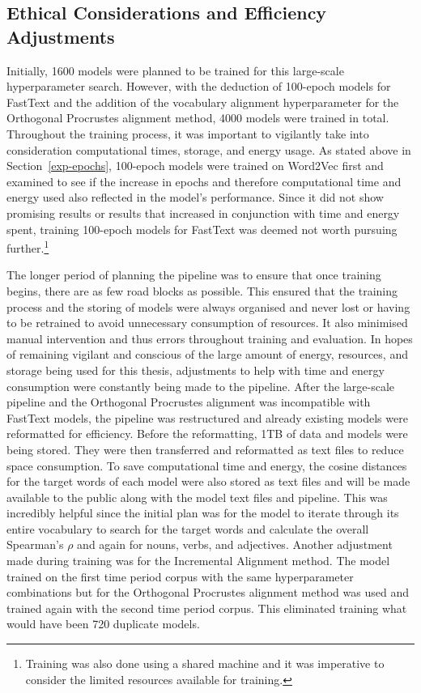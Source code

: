 \subsection{Ethical Considerations and Efficiency Adjustments}
\label{exp-ethics}

Initially, 1600 models were planned to be trained for this large-scale hyperparameter search. However, with the deduction of 100-epoch models for FastText and the addition of the vocabulary alignment hyperparameter for the Orthogonal Procrustes alignment method, 4000 models were trained in total. Throughout the training process, it was important to vigilantly take into consideration computational times, storage, and energy usage. As stated above in Section~\ref{exp-epochs}, 100-epoch models were trained on Word2Vec first and examined to see if the increase in epochs and therefore computational time and energy used also reflected in the model’s performance. Since it did not show promising results or results that increased in conjunction with time and energy spent, training 100-epoch models for FastText was deemed not worth pursuing further.\footnote{Training was also done using a shared machine and it was imperative to consider the limited resources available for training.} 

The longer period of planning the pipeline was to ensure that once training begins, there are as few road blocks as possible. This ensured that the training process and the storing of models were always organised and never lost or having to be retrained to avoid unnecessary consumption of resources. It also minimised manual intervention and thus errors throughout training and evaluation. In hopes of remaining vigilant and conscious of the large amount of energy, resources, and storage being used for this thesis, adjustments to help with time and energy consumption were constantly being made to the pipeline. After the large-scale pipeline and the Orthogonal Procrustes alignment was incompatible with FastText models, the pipeline was restructured and already existing models were reformatted for efficiency. Before the reformatting, 1TB of data and models were being stored. They were then transferred and reformatted as text files to reduce space consumption. To save computational time and energy, the cosine distances for the target words of each model were also stored as text files and will be made available to the public along with the model text files and pipeline. This was incredibly helpful since the initial plan was for the model to iterate through its entire vocabulary to search for the target words and calculate the overall Spearman’s $\rho$ and again for nouns, verbs, and adjectives. Another adjustment made during training was for the Incremental Alignment method. The model trained on the first time period corpus with the same hyperparameter combinations but for the Orthogonal Procrustes alignment method was used and trained again with the second time period corpus. This eliminated training what would have been 720 duplicate models.  

